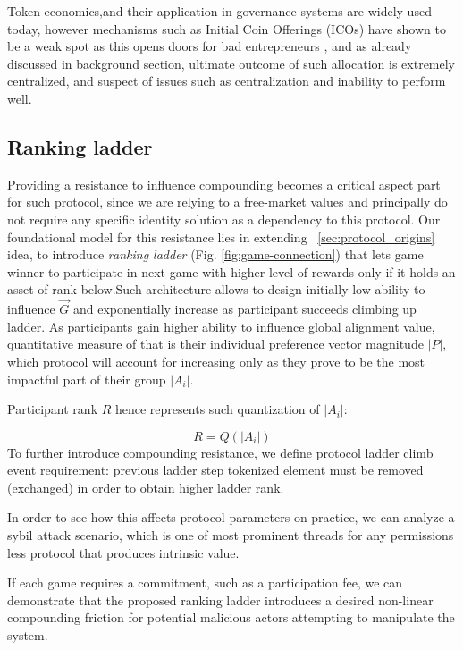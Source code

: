 \documentclass{article}
\begin{document}
\begin{CJK}{UTF8}{gbsn}
\begin{multicols}{2}
        Token economics,and their application in governance systems are widely used today, however mechanisms such as Initial Coin Offerings (ICOs) have shown to be a weak spot as this opens doors for bad entrepreneurs \cite{Johannes24}, and as already discussed in background section, ultimate outcome of such allocation is extremely centralized, and suspect of issues such as centralization and inability to perform well.

        \subsection{Ranking ladder}

        Providing a resistance to influence compounding becomes a critical aspect part for such protocol, since we are relying to a free-market values and principally do not require any specific identity solution as a dependency to this protocol.
        Our foundational model for this resistance lies in extending  ~\ref{sec:protocol_origins} idea, to introduce \textit{ranking ladder} (Fig. \ref*{fig:game-connection}) that lets game winner to participate in next game with higher level of rewards only if it holds an asset of rank below.Such architecture allows to design initially low ability to influence ${\vec{G}}$ and exponentially increase as participant succeeds climbing up ladder. As participants gain higher ability to influence global alignment value, quantitative measure of that is their individual preference vector magnitude $|P|$, which protocol will account for increasing only as they prove to be the most impactful part of their group $|A_i|$.
        
        Participant rank $R$ hence represents such quantization of $|A_i|$:

        \begin{equation}
            \label{eq:comp-quant}
            R = Q(|A_i|)
        \end{equation}
        To further introduce compounding resistance, we define protocol ladder climb event requirement: previous ladder step tokenized element must be removed (exchanged) in order to obtain higher ladder rank.


        In order to see how this affects protocol parameters on practice, we can analyze a sybil attack scenario, which is one of most prominent threads for any permissions less protocol that produces intrinsic value.


        If each game requires a commitment, such as a participation fee, we can demonstrate that the proposed ranking ladder introduces a desired non-linear compounding friction for potential malicious actors attempting to manipulate the system.


\end{multicols}
\end{CJK}
\end{document}
